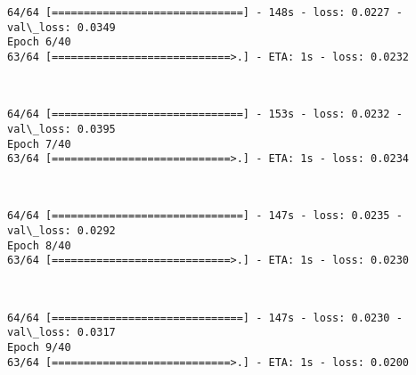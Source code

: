 \documentclass[11pt]{article}
\begin{document}
    \begin{Verbatim}[commandchars=\\\{\}]
64/64 [==============================] - 148s - loss: 0.0227 - val\_loss: 0.0349
Epoch 6/40
63/64 [============================>.] - ETA: 1s - loss: 0.0232
    \end{Verbatim}

    \begin{center}
    \end{center}
    { \hspace*{\fill} \\}
    
    \begin{Verbatim}[commandchars=\\\{\}]
64/64 [==============================] - 153s - loss: 0.0232 - val\_loss: 0.0395
Epoch 7/40
63/64 [============================>.] - ETA: 1s - loss: 0.0234
    \end{Verbatim}

    \begin{center}
    \end{center}
    { \hspace*{\fill} \\}
    
    \begin{Verbatim}[commandchars=\\\{\}]
64/64 [==============================] - 147s - loss: 0.0235 - val\_loss: 0.0292
Epoch 8/40
63/64 [============================>.] - ETA: 1s - loss: 0.0230
    \end{Verbatim}

    \begin{center}
    \end{center}
    { \hspace*{\fill} \\}
    
    \begin{Verbatim}[commandchars=\\\{\}]
64/64 [==============================] - 147s - loss: 0.0230 - val\_loss: 0.0317
Epoch 9/40
63/64 [============================>.] - ETA: 1s - loss: 0.0200
    \end{Verbatim}

    \begin{center}
    \end{center}
    { \hspace*{\fill} \\}
    
\end{document}
